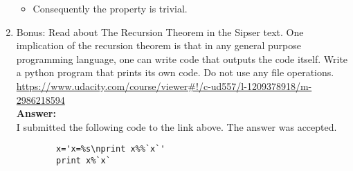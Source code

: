 \documentclass[12pt]{article}
\begin{document}
\begin{enumerate}
\begin{itemize}
	\item Consequently the property is trivial.
	\end{itemize}
\newpage
\item Bonus: Read about The Recursion Theorem in the Sipser text. One implication of the recursion theorem is that in any general purpose programming language, one can write code that outputs the code itself. Write a python program that prints its own code. Do not use any file operations.
\\[0.2in] \url{https://www.udacity.com/course/viewer#!/c-ud557/l-1209378918/m-2986218594}
\\[.2in]\textbf{Answer:}
\\[0.2in] I submitted the following code to the link above.  The answer was accepted.
		\begin{lstlisting}
		x='x=%s\nprint x%%`x`'
		print x%`x`
		\end{lstlisting}

\end{enumerate}
\end{document}
